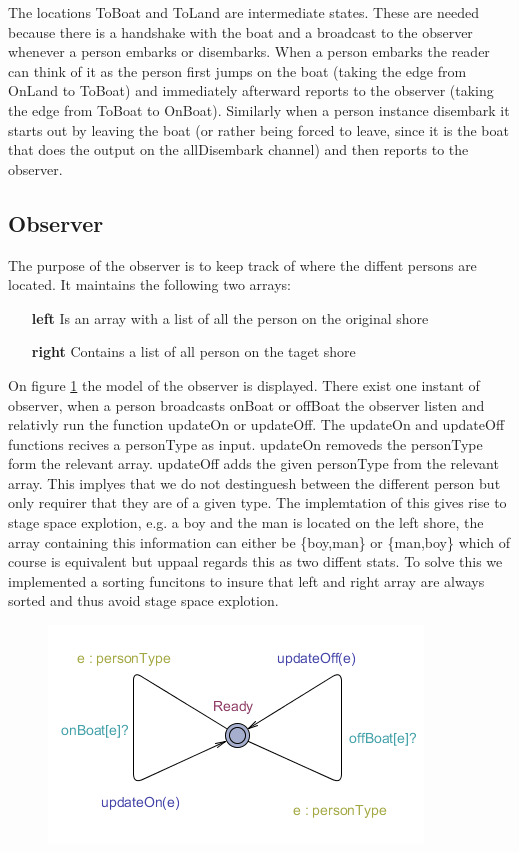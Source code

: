 The locations ToBoat and ToLand are intermediate states.
These are needed because there is a handshake with the boat and a broadcast to the observer whenever a person embarks or disembarks.
When a person embarks the reader can think of it as the person first jumps on the boat (taking the edge from OnLand to ToBoat) and immediately afterward reports to the observer (taking the edge from ToBoat to OnBoat).
Similarly when a person instance disembark it starts out by leaving the boat (or rather being forced to leave, since it is the boat that does the output on the allDisembark channel) and then reports to the observer.
















\subsection{Observer}
The purpose of the observer is to keep track of where the diffent persons are located. It maintains the following two arrays:
\begin{itemize}
	\item[\textbf{left}] Is an array with a list of all the person on the original shore
	\item[\textbf{right}] Contains a list of all person on the taget shore
\end{itemize}

On figure \ref{fig:observer} the model of the observer is displayed. There exist one instant of observer, when a person broadcasts onBoat or offBoat the observer listen and relativly run the function updateOn or updateOff. 
The updateOn and updateOff functions recives a personType as input. updateOn removeds the personType form the relevant array. updateOff adds the given personType from the relevant array. This implyes that we do not destinguesh between the different person but only requirer that they are of a given type. The implemtation of this gives rise to stage space explotion, e.g. a boy and the man is located on the left shore, the array containing this information can either be \{boy,man\} or \{man,boy\} which of course is equivalent but uppaal regards this as two diffent stats. To solve this we implemented a sorting funcitons to insure that left and right array are always sorted and thus avoid stage space explotion.

\begin{figure}%
\includegraphics[width=\columnwidth]{pictures/observer.png}%
\caption{}%
\label{fig:observer}%
\end{figure}


